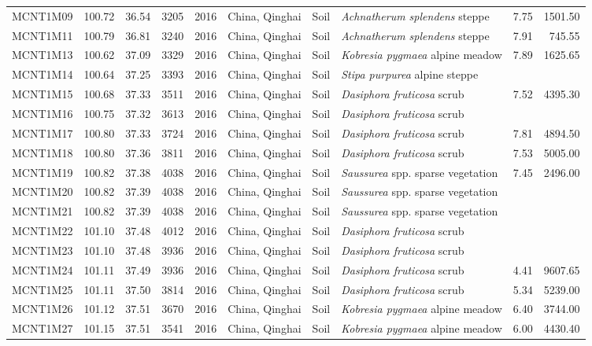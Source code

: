 \begin{table}[ht]
\begin{tabular}{rrrlrlllrr}
  MCNT1M09 & 100.72 & 36.54 & 3205 & 2016 & China, Qinghai & Soil & \textit{Achnatherum splendens} steppe & 7.75 & 1501.50 \\ 
  MCNT1M11 & 100.79 & 36.81 & 3240 & 2016 & China, Qinghai & Soil & \textit{Achnatherum splendens} steppe & 7.91 & 745.55 \\ 
  MCNT1M13 & 100.62 & 37.09 & 3329 & 2016 & China, Qinghai & Soil & \textit{Kobresia pygmaea} alpine meadow  & 7.89 & 1625.65 \\ 
  MCNT1M14 & 100.64 & 37.25 & 3393 & 2016 & China, Qinghai & Soil & \textit{Stipa purpurea} alpine steppe &  &  \\ 
  MCNT1M15 & 100.68 & 37.33 & 3511 & 2016 & China, Qinghai & Soil & \textit{Dasiphora fruticosa} scrub & 7.52 & 4395.30 \\ 
  MCNT1M16 & 100.75 & 37.32 & 3613 & 2016 & China, Qinghai & Soil & \textit{Dasiphora fruticosa} scrub &  &  \\ 
  MCNT1M17 & 100.80 & 37.33 & 3724 & 2016 & China, Qinghai & Soil & \textit{Dasiphora fruticosa} scrub & 7.81 & 4894.50 \\ 
  MCNT1M18 & 100.80 & 37.36 & 3811 & 2016 & China, Qinghai & Soil & \textit{Dasiphora fruticosa} scrub & 7.53 & 5005.00 \\ 
  MCNT1M19 & 100.82 & 37.38 & 4038 & 2016 & China, Qinghai & Soil & \textit{Saussurea} spp. sparse vegetation & 7.45 & 2496.00 \\ 
  MCNT1M20 & 100.82 & 37.39 & 4038 & 2016 & China, Qinghai & Soil & \textit{Saussurea} spp. sparse vegetation &  &  \\ 
  MCNT1M21 & 100.82 & 37.39 & 4038 & 2016 & China, Qinghai & Soil & \textit{Saussurea} spp. sparse vegetation &  &  \\ 
  MCNT1M22 & 101.10 & 37.48 & 4012 & 2016 & China, Qinghai & Soil & \textit{Dasiphora fruticosa} scrub &  &  \\ 
  MCNT1M23 & 101.10 & 37.48 & 3936 & 2016 & China, Qinghai & Soil & \textit{Dasiphora fruticosa} scrub &  &  \\ 
  MCNT1M24 & 101.11 & 37.49 & 3936 & 2016 & China, Qinghai & Soil & \textit{Dasiphora fruticosa} scrub & 4.41 & 9607.65 \\ 
  MCNT1M25 & 101.11 & 37.50 & 3814 & 2016 & China, Qinghai & Soil & \textit{Dasiphora fruticosa} scrub & 5.34 & 5239.00 \\ 
  MCNT1M26 & 101.12 & 37.51 & 3670 & 2016 & China, Qinghai & Soil & \textit{Kobresia pygmaea} alpine meadow  & 6.40 & 3744.00 \\ 
  MCNT1M27 & 101.15 & 37.51 & 3541 & 2016 & China, Qinghai & Soil & \textit{Kobresia pygmaea} alpine meadow  & 6.00 & 4430.40 \\ 

\end{tabular}
\end{table}
